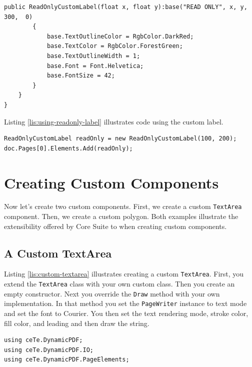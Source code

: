 \documentclass[american]{tufte-book}
\numberwithin{equation}{section}
\numberwithin{figure}{section}
\begin{document}
{{\begin{lstlisting}[caption={A extended label.},label={lis:custom-label},basicstyle={\footnotesize\ttfamily},breaklines=true]
        public ReadOnlyCustomLabel(float x, float y):base("READ ONLY", x, y, 300,  0)
        {
            base.TextOutlineColor = RgbColor.DarkRed;
            base.TextColor = RgbColor.ForestGreen;
            base.TextOutlineWidth = 1;
            base.Font = Font.Helvetica;
            base.FontSize = 42;
        }
    }
}
\end{lstlisting}
\leavevmode\egroup

Listing \ref{lis:using-readonly-label} illustrates code using the custom label.

\bgroup{}
\begin{lstlisting}[caption={Using the read-only label.},label={lis:using-readonly-label},basicstyle={\footnotesize\ttfamily},breaklines=true]
ReadOnlyCustomLabel readOnly = new ReadOnlyCustomLabel(100, 200);
doc.Pages[0].Elements.Add(readOnly);
\end{lstlisting}
\leavevmode\egroup

\section{Creating Custom Components}

Now let's create two custom components. First, we create a custom \texttt{TextArea} component. Then, we create a custom polygon. Both examples illustrate the extensibility offered by Core Suite to when creating custom components.

\subsection{A Custom TextArea}

Listing \ref{lis:custom-textarea} illustrates creating a custom \texttt{TextArea}. First, you extend the \texttt{TextArea} class with your own custom class. Then you create an empty constructor. Next you override the \texttt{Draw} method with your own implementation. In that method you set the \texttt{PageWriter} instance to text mode and set the font to Courier. You then set the text rendering mode, stroke color, fill color, and leading and then draw the string. 
\bgroup{}
\begin{lstlisting}[caption={A custom TextArea.},label={lis:custom-textarea},basicstyle={\footnotesize\ttfamily},breaklines=true]
using ceTe.DynamicPDF;
using ceTe.DynamicPDF.IO;
using ceTe.DynamicPDF.PageElements;


\end{lstlisting}}}
\end{document}
